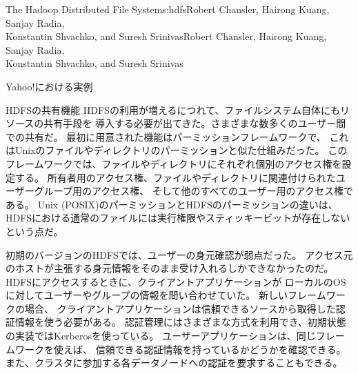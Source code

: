 \begin{aosachaptertoc}{The Hadoop Distributed File System}{s:hdfs}{Robert Chansler, Hairong Kuang, Sanjay Radia, \\ Konstantin Shvachko, and Suresh Srinivas}{Robert Chansler, Hairong Kuang, Sanjay Radia, \\ \hspace*{0.9cm} Konstantin Shvachko, and Suresh Srinivas}
\begin{aosasect1}{Yahoo!における実例}
\begin{aosasect2}{HDFSの共有機能}
HDFSの利用が増えるにつれて、ファイルシステム自体にもリソースの共有手段を
導入する必要が出てきた。さまざまな数多くのユーザー間での共有だ。
最初に用意された機能はパーミッションフレームワークで、
これはUnixのファイルやディレクトリのパーミッションと似た仕組みだった。
このフレームワークでは、ファイルやディレクトリにそれぞれ個別のアクセス権を設定する。
所有者用のアクセス権、ファイルやディレクトリに関連付けられたユーザーグループ用のアクセス権、
そして他のすべてのユーザー用のアクセス権である。
Unix (POSIX)のパーミッションとHDFSのパーミッションの違いは、
HDFSにおける通常のファイルには実行権限やスティッキービットが存在しないという点だ。

初期のバージョンのHDFSでは、ユーザーの身元確認が弱点だった。
アクセス元のホストが主張する身元情報をそのまま受け入れるしかできなかったのだ。
HDFSにアクセスするときに、クライアントアプリケーションが
ローカルのOSに対してユーザーやグループの情報を問い合わせていた。
新しいフレームワークの場合、
クライアントアプリケーションは信頼できるソースから取得した認証情報を使う必要がある。
認証管理にはさまざまな方式を利用でき、初期状態の実装ではKerberosを使っている。
ユーザーアプリケーションは、同じフレームワークを使えば、
信頼できる認証情報を持っているかどうかを確認できる。
また、クラスタに参加する各データノードへの認証を要求することもできる。


\end{aosasect2}
\end{aosasect1}
\end{aosachaptertoc}
